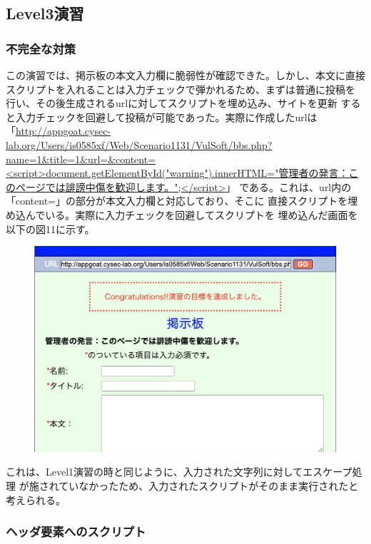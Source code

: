 \documentclass[dvipdfmx,autodetect-engine,titlepage]{jsarticle}
\begin{document}
\subsection{Level3演習}

\subsubsection*{不完全な対策}
この演習では、掲示板の本文入力欄に脆弱性が確認できた。しかし、本文に直接
スクリプトを入れることは入力チェックで弾かれるため、まずは普通に投稿を
行い、その後生成されるurlに対してスクリプトを埋め込み、サイトを更新
すると入力チェックを回避して投稿が可能であった。実際に作成したurlは「\url{http://appgoat.cysec-lab.org/Users/is0585xf/Web/Scenario1131/VulSoft/bbs.php?name=1&title=1&url=&content=<script>document.getElementById("warning").innerHTML="管理者の発言：このページでは誹謗中傷を歓迎します。";</script>}」
である。これは、url内の「content=」の部分が本文入力欄と対応しており、そこに
直接スクリプトを埋め込んでいる。実際に入力チェックを回避してスクリプトを
埋め込んだ画面を以下の図11に示す。

\begin{figure}[h]
  \centering
  \includegraphics[scale=0.5]{pic11.png}
  \caption{}
\end{figure}

これは、Level1演習の時と同じように、入力された文字列に対してエスケープ処理
が施されていなかったため、入力されたスクリプトがそのまま実行されたと考えられる。

\subsubsection*{ヘッダ要素へのスクリプト}
\end{document}

